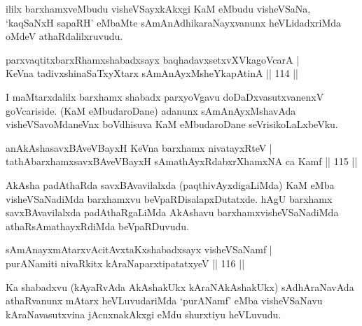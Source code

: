 \begin{artha}
ililx barxhamxveMbudu visheVSayxkAkxgi KaM eMbudu visheVSaNa, `kaqSaNxH sapaRH' eMbaMte sAmAnAdhikaraNayxvanunx heVLidadxriMda oMdeV athaRdalilxruvudu.
\end{artha}

\begin{shl}
parxvaqtitxbarxRhamxshabadxsayx baqhadavxsetxvXVkagoVcarA  | \\
KeVna tadivxshinaSaTxyXtarx \footnotemark{}sAmAnAyxMsheYkapAtinA \hfill||  114 ||  
\end{shl}

\begin{artha}
I maMtarxdalilx barxhamx shabadx parxyoVgavu doDaDxvasutxvanenxV goVcariside. (KaM eMbudaroDane) adanunx sAmAnAyxMshavAda visheVSavoMdaneVnx boVdhisuva KaM eMbudaroDane seVrisikoLaLxbeVku.
\end{artha}


\begin{shl}
anAkAshasavxBAveVBayxH KeVna barxhamx nivatayxRteV  | \\
tathA\s barxhamxsavxBAveVBayxH sAmathAyxRdabxrXhamxNA ca Kamf \hfill||  115 ||  
\end{shl}

\begin{artha}
AkAsha padAthaRda savxBAvavilalxda (paqthivAyxdigaLiMda) KaM eMba visheVSaNadiMda barxhamxvu beVpaRDisalapxDutatxde. hAgU barxhamx savxBAvavilalxda padAthaRgaLiMda AkAshavu barxhamxvisheVSaNadiMda athaRsAmathayxRdiMda beVpaRDuvudu.
\end{artha}

\begin{shl}
sAmAnayxmAtarxvAcitAvxtaKxshabadxsayx visheVSaNamf  | \\
purANamiti nivaRkitx kAraNaparxtipatatxyeV \hfill||  116 ||  
\end{shl}

\begin{artha}
Ka shabadxvu (kAyaRvAda AkAshakUkx kAraNAkAshakUkx) sAdhAraNavAda athaRvanunx mAtarx heVLuvudariMda `purANamf' eMba visheVSaNavu kAraNavasutxvina jAcnxnakAkxgi eMdu shurxtiyu heVLuvudu.
\end{artha}

